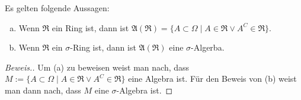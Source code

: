 \begin{lemma}
    Es gelten folgende Aussagen:
    \begin{enumerate}[(a)]
        \item Wenn $\mathfrak{R}$ ein Ring ist, dann ist $\mathfrak{A}(\mathfrak{R})=\{A\subset\Omega\mid A\in\mathfrak{R}\lor A^C\in\mathfrak{R}\}$.
        \item Wenn $\mathfrak{R}$ ein $\sigma$-Ring ist, dann ist $\mathfrak{A}(\mathfrak{R})$ eine $\sigma$-Algerba.
    \end{enumerate}  
\end{lemma}
 \begin{proof}[Beweis.]
     Um (a) zu beweisen weist man nach, dass $M:=\{A\subset\Omega\mid A\in\mathfrak{R}\lor A^C\in\mathfrak{R}\}$ eine Algebra ist.\newline
     Für den Beweis von (b) weist man dann nach, dass $M$ eine $\sigma$-Algebra ist.
 \end{proof}